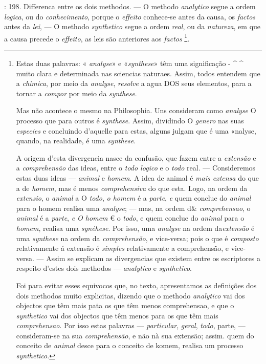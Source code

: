 : 198. Differenca entre os dois methodos. --- O methodo \emph{analytico} segue a ordem \emph{logica}, ou do \emph{conhecimento}, porque o \emph{effeito} conhece-se antes da causa, os \emph{factos} antes da \emph{lei}, --- O methodo \emph{synthetico} segue a ordem \emph{real}, ou da \emph{natureza}, em que a causa precede o \emph{effeito}, as leis são anteriores aos \emph{factos} \footnote{Estas duas palavras: « \emph{analyse}» e «\emph{synthese}» têm uma significação - \textasciicircum{} \textasciicircum{} muito clara e determinada nas sciencias naturaes. Assim, todos entendem que a \emph{chimica}, por meio da \emph{analyse}, \emph{resolve} a agua DOS seus elementos, para a tornar a \emph{compor} por meio da \emph{synthese}.\par Mas não acontece o mesmo na Philosophia. Uns consideram como \emph{analyse} O processo que para outros é \emph{synthese}. Assim, dividindo O \emph{genero} nas suas \emph{especies} e concluindo d'aquelle para estas, alguns julgam que é uma «nalyse, quando, na realidade, é uma \emph{synthese}.\par A origem d'esta divergencia nasce da confusão, que fazem entre a \emph{extensão} e a \emph{comprehensão} das ideas, entre o \emph{todo logico} e o \emph{todo} real. --- Consideremos estas duas ideas --- \emph{animal} e \emph{homem}. A idea de animal é \emph{mais extensa} do que a de \emph{homem}, mas é menos \emph{comprehensiva} do que esta. Logo, na ordem da \emph{extensio}, o \emph{animal} a O \emph{todo}, \emph{o homem} é a \emph{parte}, \emph{e} quem conclue do \emph{animal} para o homem realisa uma \emph{analyse}; --- mas, na ordem d\& \emph{comprehensao}, o \emph{animal} é a \emph{parte}, \emph{e O homem} € o \emph{todo}, e quem conclue do \emph{animal} para o \emph{homem}, realisa uma \emph{synéhese}. Por isso, uma \emph{analyse} na ordem da\emph{extensão} é uma \emph{synthese} na ordem da \emph{comprehensão}, e vice-versa; pois o que é \emph{composto} relativamente á extensão é \emph{simples} relativamente a comprehensão, e vice-versa. --- Assim se explicam as divergencias que existem entre os escriptores a respeito d'estes dois methodos --- \emph{analytico} e \emph{synthetico}.\par Foi para evitar esses equivocos que, no texto, apresentamos as definições dos dois methodos muito explicitas, dizendo que o methodo \emph{analytico} vai dos objectos que têm mais pata os que têm menos comprehensao, e que o \emph{synthetico} vai dos objectos que têm menos para os que têm mais \emph{comprehensao}. Por isso estas palavras --- \emph{particular}, \emph{geral}, \emph{todo}, parte, --- consideram-se na sua \emph{comprehensão}, e não nà sua extensão; assim. quem do conceito de \emph{animal} desce para o conceito de komem, realisa um processo \emph{synthetico}.}.

